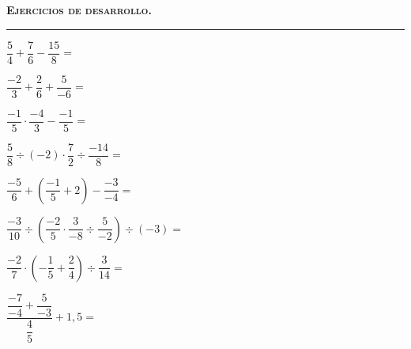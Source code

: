 \documentclass[spanish,letterpaper, 12pt, addpoints, answers]{exam}
\begin{document}
\parbox{16cm}{
{\textsc{\textbf{Ejercicios de desarrollo.}}}}

\vspace{0.15in}
\hrule 
\begin{questions}


\question[3]  $\dfrac{5}{4}+ \dfrac{7}{6}- \dfrac{15}{8} =$\\
\vspace{3cm}

\question[3]  $\dfrac{-2}{3}+ \dfrac{2}{6} + \dfrac{5}{-6}=$\\
\vspace{4cm}

\question[3]  $\dfrac{-1}{5}\cdot \dfrac{-4}{3}-\dfrac{-1}{5}=$\\
\vspace{4cm}

\question[3]  $\dfrac{5}{8}\div (-2)\cdot \dfrac{7}{2}\div \dfrac{-14}{8}=$\\
\vspace{4.5cm}

\question[3]  $\dfrac{-5}{6}+\left(\dfrac{-1}{5}+2\right)-\dfrac{-3}{-4}=$\\
\vspace{4.5cm}

\question[3]  $\dfrac{-3}{10}\div\left(\dfrac{-2}{5}\cdot\dfrac{3}{-8}\div\dfrac{5}{-2}\right)\div (-3)=$\\
\vspace{4.55cm}

\question[3]  $\dfrac{-2}{7}\cdot \left(-\dfrac{1}{5}+\dfrac{2}{4}\right)\div\dfrac{3}{14}=$\\
\vspace{6cm}

\question[3]  $\dfrac{\dfrac{-7}{-4}+\dfrac{5}{-3}}{\dfrac{4}{5}}+1{,}5=$\\
\vspace{6cm}

\end{questions}
\end{document}
